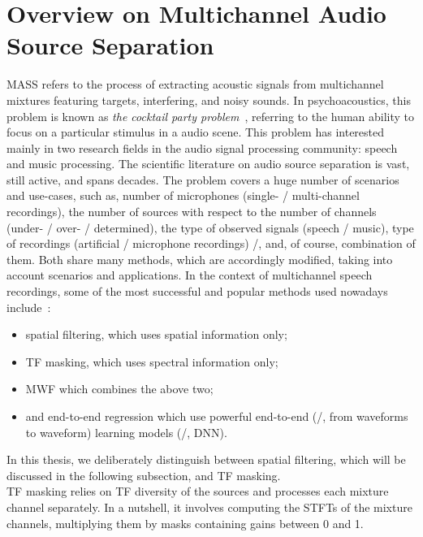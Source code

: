 \section{Overview on Multichannel Audio Source Separation}\label{sec:application:separation}
\acf{MASS} refers to the process of extracting acoustic signals from multichannel mixtures featuring targets, interfering, and noisy sounds.
In psychoacoustics, this problem is known as \textit{the cocktail party problem}~, referring to the human ability to focus on a particular stimulus in a audio scene.
This problem has interested mainly in two research fields in the audio signal processing community: speech and music processing.
The scientific literature on audio source separation is vast, still active, and spans decades.
The problem covers a huge number of scenarios and use-cases, such as, number of microphones (single- \vs/ multi-channel recordings), the number of sources with respect to the number of channels (under- \vs/ over- \vs/ determined), the type of observed signals (speech \vs/ music), type of recordings (artificial \vs/ microphone recordings) \etc/, and, of course, combination of them.
Both share many methods, which are accordingly modified, taking into account scenarios and applications.
In the context of multichannel speech recordings, some of the most successful and popular methods used nowadays include~:
\begin{itemize}
    \item spatial filtering, which uses spatial information only;
    \item \ac{TF} masking, which uses spectral information only;
    \item \ac{MWF} which combines the above two;
    \item and end-to-end regression which use powerful end-to-end (\ie/, from waveforms to waveform) learning models (\eg/, \ac{DNN}).
\end{itemize}
In this thesis, we deliberately distinguish between spatial filtering, which will be discussed in the following subsection, and \ac{TF} masking.
\\\ac{TF} masking relies on \ac{TF} diversity of the sources and processes each mixture channel separately.
In a nutshell, it involves computing the \acp{STFT} of the mixture channels, multiplying them by masks containing gains between 0 and 1.
